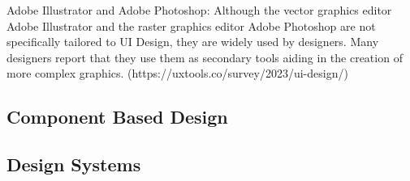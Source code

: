        Adobe Illustrator and Adobe Photoshop:
        Although the vector graphics editor Adobe Illustrator and the raster graphics editor Adobe Photoshop are not specifically tailored to UI Design, they are widely used by designers.
        Many designers report that they use them as secondary tools aiding in the creation of more complex graphics.
        (https://uxtools.co/survey/2023/ui-design/)

    \subsection{Component Based Design}

    \subsection{Design Systems}
